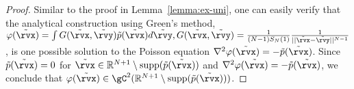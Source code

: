 \begin{proof}

Similar to the proof in Lemma~\ref{lemma:ex-uni}, one can easily verify that the analytical construction using Green's method, \ie $\varphi(\tilde{\rvx}) = \int G(\tilde{\rvx},\tilde{\rvy})\tilde{p}(\tilde{\rvx})d\tilde{\rvy}, G(\tilde{\rvx},\tilde{\rvy}) = \frac{1}{(N-1)S_{N}(1)} \frac{1}{||\tilde{\rvx}-\tilde{\rvy}||^{N-1}}$, is one possible solution to the Poisson equation $\nabla^2\varphi(\tilde{\rvx})=-\tilde{p}(\tilde{\rvx})$. Since $\tilde{p}(\tilde{\rvx})=0$ for  $\tilde{\rvx} \in \mathbb{R}^{N+1} \setminus \textrm{supp}(\tilde{p}(\tilde{\rvx}))$ and $\nabla^2\varphi(\tilde{\rvx})=-\tilde{p}(\tilde{\rvx})$, we conclude that $\varphi(\tilde{\rvx})\in \gC^2(\mathbb{R}^{N+1} \setminus \textrm{supp}(\tilde{p}(\tilde{\rvx})))$.


\end{proof}
